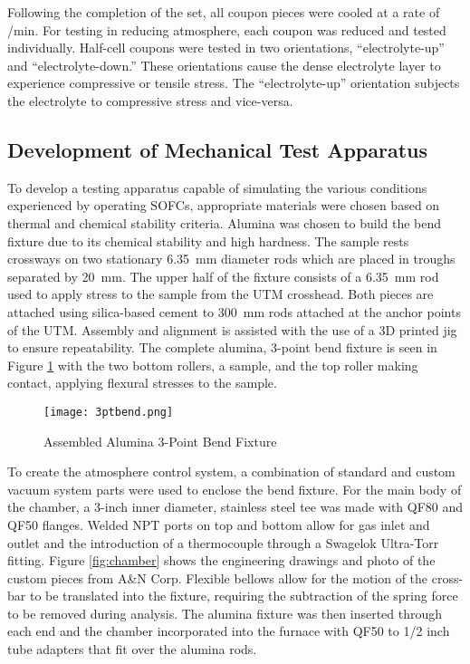     Following the completion of the set, all coupon pieces were cooled at a rate of /min.
    For testing in reducing atmosphere, each coupon was reduced and tested individually.
    Half-cell coupons were tested in two orientations, ``electrolyte-up'' and ``electrolyte-down.''
    These orientations cause the dense electrolyte layer to experience compressive or tensile stress.
    The ``electrolyte-up'' orientation subjects the electrolyte to compressive stress and vice-versa.

    \subsection{Development of Mechanical Test Apparatus}
        To develop a testing apparatus capable of simulating the various conditions experienced by operating SOFCs, appropriate materials were chosen based on thermal and chemical stability criteria.
        Alumina was chosen to build the bend fixture due to its chemical stability and high hardness.
        The sample rests crossways on two stationary \SI{6.35}{\milli\meter} diameter rods which are placed in troughs separated by \SI{20}{\milli\meter}.
        The upper half of the fixture consists of a \SI{6.35}{\milli\meter} rod used to apply stress to the sample from the UTM crosshead.
        Both pieces are attached using silica-based cement to \SI{300}{\milli\meter} rods attached at the anchor points of the UTM.
        Assembly and alignment is assisted with the use of a 3D printed jig to ensure repeatability.
        The complete alumina, 3-point bend fixture is seen in Figure \ref{fig:3ptbend} with the two bottom rollers, a sample, and the top roller making contact, applying flexural stresses to the sample.

        \begin{figure}[p]
            \texttt{[image: 3ptbend.png]}
            \caption{Assembled Alumina 3-Point Bend Fixture}
            \label{fig:3ptbend}
        \end{figure}

        To create the atmosphere control system, a combination of standard and custom vacuum system parts were used to enclose the bend fixture.
        For the main body of the chamber, a 3-inch inner diameter, stainless steel tee was made with QF80 and QF50 flanges.
        Welded NPT ports on top and bottom allow for gas inlet and outlet and the introduction of a thermocouple through a Swagelok Ultra-Torr fitting.
        Figure \ref{fig:chamber} shows the engineering drawings and photo of the custom pieces from A\&N Corp.
        Flexible bellows allow for the motion of the cross-bar to be translated into the fixture, requiring the subtraction of the spring force to be removed during analysis.
        The alumina fixture was then inserted through each end and the chamber incorporated into the furnace with QF50 to 1/2 inch tube adapters that fit over the alumina rods.

